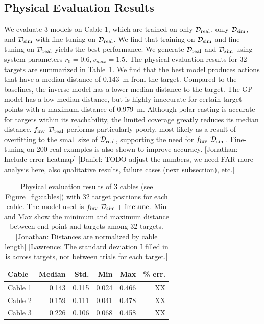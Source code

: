 \documentclass[letterpaper, 10 pt, conference]{ieeeconf}  %
\newcommand{\remark}[3]{{\color{#2}[#1: #3]}}
\newcommand{\daniel}[1]{\remark{Daniel}{blue}{#1}}
\newcommand{\jonathan}[1]{\remark{Jonathan}{cyan}{#1}}
\newcommand{\Lawrence}[1]{\remark{Lawrence}{orange}{#1}}
\begin{document}
\subsection{Physical Evaluation Results}
We evaluate 3 models on Cable 1, which are trained on only $\mathcal{D}_{\rm real}$, only $\mathcal{D}_{\rm sim}$, and $\mathcal{D}_{\rm sim}$ with fine-tuning on $\mathcal{D}_{\rm real}$. We find that training on $\mathcal{D}_{\rm sim}$ and fine-tuning on $\mathcal{D}_{\rm real}$ yields the best performance. We generate $\mathcal{D}_{\rm real}$ and $\mathcal{D}_{\rm sim}$ using system parameters $r_0=0.6, v_{max}=1.5$. The physical evaluation results for 32 targets are summarized in Table~\ref{tab:results}. We find that the best model produces actions that have a median distance of \SI{0.143}{\meter} from the target. Compared to the baselines, the inverse model has a lower median distance to the target. The GP model has a low median distance, but is highly inaccurate for certain target points with a maximum distance of \SI{0.979}{\meter}. Although polar casting is accurate for targets within its reachability,  the limited coverage greatly reduces its median distance. $f_{\rm inv}$ $\mathcal{D}_{\rm real}$ performs particularly poorly, most likely as a result of overfitting to the small size of $\mathcal{D}_{\rm real}$, supporting the need for $f_{\rm inv}$ $\mathcal{D}_{\rm sim}$. Fine-tuning on 200 real examples is also shown to improve accuracy. \jonathan{Include error heatmap}
\daniel{TODO adjust the numbers, we need FAR more analysis here, also qualitative results, failure cases (next subsection), etc.}

\begin{table}[ht!]
  \setlength\tabcolsep{5.0pt}
  \centering
  \caption{
    Physical evaluation results of 3 cables (see Figure~\ref{fig:cables}) with 32 target positions for each cable. The model used is $f_{\rm inv}$ $\mathcal{D}_{\rm sim} + \rm finetune$. Min and Max show the minimum and maximum distance between end point and targets among 32 targets. \jonathan{Distances are normalized by cable length} \Lawrence{The standard deviation I filled in is across targets, not between trials for each target.}
  }
  \small
  \begin{tabular}{@{}lrrrrr}
  \toprule
  Cable      & Median  & Std.  & Min & Max & \% err.  \\
  \midrule
  Cable 1    & 0.143 & 0.115 & 0.024 & 0.466 & XX  \\
  Cable 2    & 0.159 & 0.111 & 0.041 & 0.478 & XX  \\
  Cable 3   & 0.226 & 0.106 & 0.068 & 0.458 & XX \\
  \toprule
  \end{tabular}
  \label{tab:results}
\end{table}  
\end{document}
